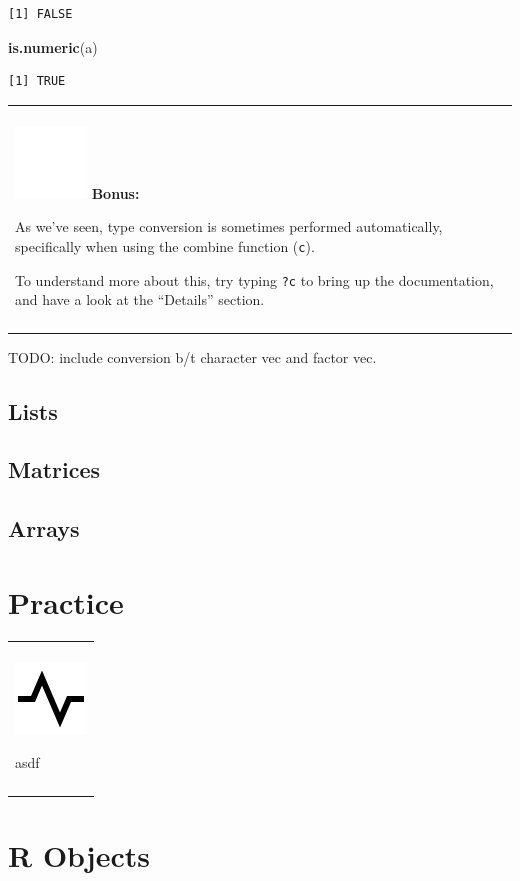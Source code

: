 \documentclass[
]{book}
\newenvironment{Shaded}{\begin{snugshade}}{\end{snugshade}}
\newcommand{\KeywordTok}[1]{\textcolor[rgb]{0.13,0.29,0.53}{\textbf{#1}}}
\newcommand{\NormalTok}[1]{#1}
\newenvironment{bonus}
{
  \begin{center}
  \begin{tabular}{|>{\columncolor{bonus}\color{white}}p{0.9\textwidth}|}\hline\\
  \includegraphics[scale=0.1]{src/images/sun-fill-invert.png}
  \textbf{Bonus:}
}
{\\\\\hline
  \end{tabular}
  \end{center}
}
\newenvironment{progress}
{
  \begin{center}
  \begin{tabular}{|>{\columncolor{progress}}p{0.9\textwidth}|}
  \hline\\
  \includegraphics[scale=0.1]{src/images/pulse-line.png}
}
{\\\\\hline
  \end{tabular}
  \end{center}
}
\begin{document}
\begin{verbatim}
[1] FALSE
\end{verbatim}

\begin{Shaded}
\begin{Highlighting}[]
\KeywordTok{is.numeric}\NormalTok{(a)}
\end{Highlighting}
\end{Shaded}

\begin{verbatim}
[1] TRUE
\end{verbatim}

\begin{bonus}
As we've seen, type conversion is sometimes performed automatically,
specifically when using the combine function (\texttt{c}).

To understand more about this, try typing \texttt{?c} to bring up the
documentation, and have a look at the ``Details'' section.
\end{bonus}

TODO: include conversion b/t character vec and factor vec.

\hypertarget{lists}{%
\subsection{Lists}\label{lists}}

\hypertarget{matrices}{%
\subsection{Matrices}\label{matrices}}

\hypertarget{arrays}{%
\subsection{Arrays}\label{arrays}}

\hypertarget{practice}{%
\section{Practice}\label{practice}}

\begin{progress}
asdf
\end{progress}

\hypertarget{r-objects}{%
\section{R Objects}\label{r-objects}}
\end{document}
